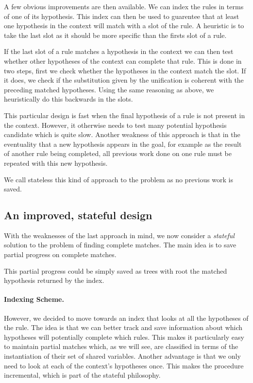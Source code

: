 \documentclass[runningheads]{llncs}
\begin{document}
A few obvious improvements are then available. We can index the rules in terms of one of its
hypothesis. This index can then be used to guarentee that at least one hypothesis in the context will
match with a slot of the rule. A heuristic is to take the last slot as it should be more specific
than the firsts slot of a rule.

If the last slot of a rule matches a hypothesis in the context we can then test
whether other hypotheses of the context can complete that rule.
This is done in two steps, first we check whether the hypotheses in the context match the slot.
If it does, we check if the substitution given by the unification is coherent with
the preceding matched hypotheses.
Using the same reasoning as above, we heuristically do this backwards in the slots.

This particular design is fast when the final hypothesis of a rule is not present in the context. 
However, it otherwise needs to test many potential hypothesis candidate which is quite slow.
Another weakness of this approach is that in the eventuality that a new hypothesis appears in the
goal, for example as the result of another rule being completed, all previous work done on one rule
must be repeated with this new hypothesis.

We call stateless this kind of approach to the problem as no previous work is saved.

\subsection{An improved, stateful design}

With the weaknesses of the last approach in mind, we now consider a
\textit{stateful} solution to the problem of finding complete matches.
The main idea is to save partial progress on complete matches.

This partial progress could be simply saved as trees with root the matched
hypothesis returned by the index.


\paragraph{Indexing Scheme.}
However, we decided to move towards an index that looks at all the hypotheses of 
the rule.
The idea is that we can better track and save information about
which hypotheses will potentially complete which rules.
This makes it particularly easy to maintain partial matches which, as we will see,
are classified in terms of the instantiation of their set of shared variables.
Another advantage is that we only need to look at each of the context's
hypotheses once.
This makes the procedure incremental, which is part of the stateful philosophy.
\end{document}
